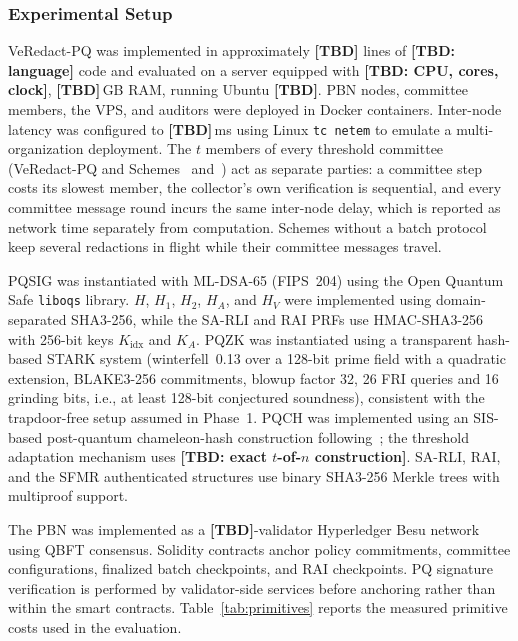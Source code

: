 \documentclass[lettersize,journal]{IEEEtran}
\begin{document}
\subsubsection{Experimental Setup}

VeRedact-PQ was implemented in approximately \textbf{[TBD]} lines of
\textbf{[TBD: language]} code and evaluated on a server equipped with
\textbf{[TBD: CPU, cores, clock]}, \textbf{[TBD]}\,GB RAM, running
Ubuntu \textbf{[TBD]}. PBN nodes, committee members, the VPS, and
auditors were deployed in Docker containers. Inter-node latency was
configured to \textbf{[TBD]}\,ms using Linux \texttt{tc netem} to
emulate a multi-organization deployment.\textcolor{e1}{ The $t$ members
of every threshold committee (VeRedact-PQ and Schemes~\cite{ref1}
and~\cite{ref27}) act as separate parties: a committee step costs its
slowest member, the collector's own verification is sequential, and
every committee message round incurs the same inter-node delay, which is
reported as network time separately from computation. Schemes without a
batch protocol keep several redactions in flight while their committee
messages travel.}

PQSIG was instantiated with ML-DSA-65 (FIPS~204) using the Open
Quantum Safe \texttt{liboqs} library. $H$, $H_1$, $H_2$, $H_A$, and
$H_V$ were implemented using domain-separated SHA3-256, while the
SA-RLI and RAI PRFs use HMAC-SHA3-256 with 256-bit keys
$K_{\mathrm{idx}}$ and $K_A$. PQZK was instantiated using a
transparent hash-based STARK system \textcolor{e2}{(winterfell~0.13
over a 128-bit prime field with a quadratic extension, BLAKE3-256
commitments, blowup factor 32, 26 FRI queries and 16 grinding bits,
i.e., at least 128-bit conjectured soundness)},
consistent with the trapdoor-free setup assumed in Phase~1. PQCH was
implemented using an SIS-based post-quantum chameleon-hash construction
following~\cite{ref10,ref17}; the threshold adaptation mechanism uses
\textbf{[TBD: exact $t$-of-$n$ construction]}. SA-RLI, RAI, and the
SFMR authenticated structures use binary SHA3-256 Merkle trees with
multiproof support.

The PBN was implemented as a \textbf{[TBD]}-validator Hyperledger Besu
network using QBFT consensus. Solidity contracts anchor policy
commitments, committee configurations, finalized batch checkpoints,
and RAI checkpoints. PQ signature verification is performed by
validator-side services before anchoring rather than within the smart
contracts. Table~\ref{tab:primitives} reports the measured primitive
costs used in the evaluation.
\end{document}
